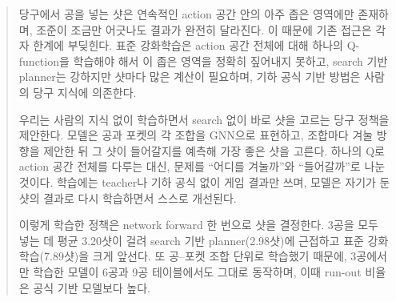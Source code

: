 \begin{abstract}
당구에서 공을 넣는 샷은 연속적인 action 공간 안의 아주 좁은 영역에만 존재하며, 조준이 조금만 어긋나도 결과가 완전히 달라진다.
이 때문에 기존 접근은 각자 한계에 부딪힌다.
표준 강화학습은 action 공간 전체에 대해 하나의 Q-function을 학습해야 해서 이 좁은 영역을 정확히 짚어내지 못하고,
search 기반 planner는 강하지만 샷마다 많은 계산이 필요하며,
기하 공식 기반 방법은 사람의 당구 지식에 의존한다.

우리는 사람의 지식 없이 학습하면서 search 없이 바로 샷을 고르는 당구 정책을 제안한다.
모델은 공과 포켓의 각 조합을 GNN으로 표현하고, 조합마다 겨눌 방향을 제안한 뒤 그 샷이 들어갈지를 예측해 가장 좋은 샷을 고른다.
하나의 Q로 action 공간 전체를 다루는 대신, 문제를 ``어디를 겨눌까''와 ``들어갈까''로 나눈 것이다.
학습에는 teacher나 기하 공식 없이 게임 결과만 쓰며, 모델은 자기가 둔 샷의 결과로 다시 학습하면서 스스로 개선된다.

이렇게 학습한 정책은 network forward 한 번으로 샷을 결정한다.
3공을 모두 넣는 데 평균 3.20샷이 걸려 search 기반 planner(2.98샷)에 근접하고 표준 강화학습(7.89샷)을 크게 앞선다.
또 공--포켓 조합 단위로 학습했기 때문에, 3공에서만 학습한 모델이 6공과 9공 테이블에서도 그대로 동작하며,
이때 run-out 비율은 공식 기반 모델보다 높다.
\end{abstract}
